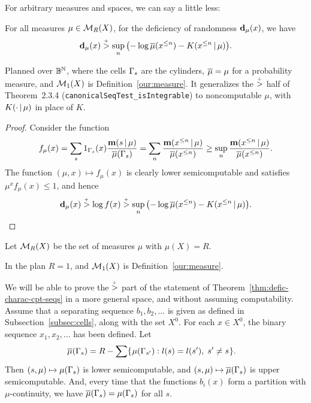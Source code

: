 For arbitrary measures and spaces, we can say a little less:

 \begin{proposition}\label{propo:test-charac-seq-lb}
For all measures \( \mu\in\mathcal{M}_{R}(X) \), 
for the deficiency of randomness \( \mathbf{d}_{\mu}(x) \), we have
 \begin{equation}\label{eq:defic-ineq-seq}
 \mathbf{d}_{\mu}(x) \stackrel{{}_+}{>} \sup_{n}{\left( -\log \overline{\mu}(x^{\le n}) - K(x^{\le n} \,\vert\, \mu)\right)}.
 \end{equation}
 \end{proposition}

\begin{formalization}
Planned over $\mathbb{B}^{\mathbb{N}}$, where the cells $\Gamma_{s}$ are the cylinders, $\overline{\mu} = \mu$ for a
probability measure, and $\mathcal{M}_{1}(X)$ is Definition~\ref{our:measure}. It generalizes the
$\stackrel{{}_+}{>}$ half of Theorem~2.3.4 (\texttt{canonicalSeqTest\_isIntegrable}) to noncomputable $\mu$,
with $K(\cdot \,\vert\, \mu)$ in place of $K$.
\end{formalization}
 \begin{proof}
  Consider the function
 \[
 f_{\mu}(x) = \sum_{s} 1_{\Gamma_{s}}(x) \frac{\mathbf{m}(s \,\vert\, \mu)}{\overline{\mu}(\Gamma_{s})}
  = \sum_{n} \frac{\mathbf{m}(x^{\le n} \,\vert\, \mu)}{\overline{\mu}(x^{\le n})}
  \ge \sup_{n} \frac{\mathbf{m}(x^{\le n} \,\vert\, \mu)}{\overline{\mu}(x^{\le n})}.
 \]
The function \( (\mu,x) \mapsto f_{\mu}(x) \) 
is clearly lower semicomputable and satisfies
\( \mu^{x} f_{\mu}(x) \le 1 \), and hence 
 \[
  \mathbf{d}_{\mu}(x) \stackrel{{}_+}{>} \log f(x) \stackrel{{}_+}{>} 
   \sup_{n}{\left( -\log\overline{\mu}(x^{\le n}) - K(x^{\le n} \,\vert\, \mu)\right)}.
 \]
 \end{proof}

\begin{definition}
  \label{def:g4.6.8}
Let \( \mathcal{M}_{R}(X) \) be the set of measures \( \mu \) with \( \mu(X)=R \).  
\end{definition}

\begin{formalization}
In the plan $R = 1$, and $\mathcal{M}_{1}(X)$ is Definition~\ref{our:measure}.
\end{formalization}

We will be able to prove the \( \stackrel{{}_+}{>} \) part of the statement of
Theorem~\ref{thm:defic-charac-cpt-seqs} in a more general
space, and without assuming computability.
Assume that a separating sequence \( b_{1},b_{2},\dots \) is given as defined
in Subsection~\ref{subsec:cells}, along with the set \( X^{0} \).
For each \( x \in X^{0} \), the binary sequence \( x_{1},x_{2},\dots \) 
has been defined.
Let
 \begin{align*}
  \overline{\mu}(\Gamma_{s}) &= R  - \sum\mathopen\{\mskip 1mu\mu(\Gamma_{s'}) : l(s)=l(s'),\;s'\ne s\mskip 1mu\mathclose\}.
 \end{align*}
Then \( (s,\mu)\mapsto \mu(\Gamma_{s}) \) is lower semicomputable, and 
\( (s,\mu)\mapsto \overline{\mu}(\Gamma_{s}) \) is upper semicomputable.
And, every time that the functions \( b_{i}(x) \) form a partition
with \( \mu \)-continuity, we have \( \overline{\mu}(\Gamma_{s})=\mu(\Gamma_{s}) \) for all \( s \).

